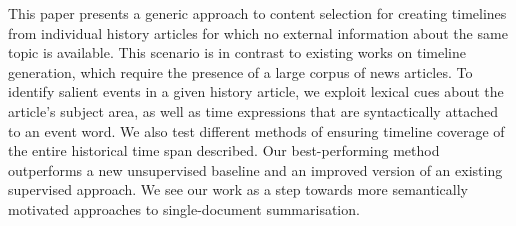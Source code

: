 This paper presents a generic approach to content selection for creating timelines from individual history articles for which no external information about the same topic is available. This scenario is in contrast to existing works on timeline generation, which require the presence of a large corpus of news articles. To identify salient events in a given history article, we exploit lexical cues about the article's subject area, as well as time expressions that are syntactically attached to an event word. We also test different methods of ensuring timeline coverage of the entire historical time span described. Our best-performing method outperforms a new unsupervised baseline and an improved version of an existing supervised approach. We see our work as a step towards more semantically motivated approaches to single-document summarisation.
